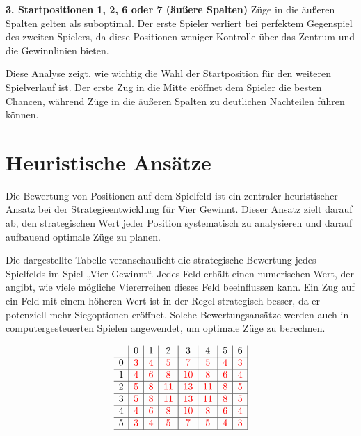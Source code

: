 	\textbf{3. Startpositionen 1, 2, 6 oder 7 (äußere Spalten)}
	Züge in die äußeren Spalten gelten als suboptimal. Der erste Spieler verliert bei perfektem Gegenspiel des zweiten Spielers, da diese Positionen weniger Kontrolle über das Zentrum und die Gewinnlinien bieten.
	
	Diese Analyse zeigt, wie wichtig die Wahl der Startposition für den weiteren Spielverlauf ist. Der erste Zug in die Mitte eröffnet dem Spieler die besten Chancen, während Züge in die äußeren Spalten zu deutlichen Nachteilen führen können.

\section{Heuristische Ansätze}

Die Bewertung von Positionen auf dem Spielfeld ist ein zentraler heuristischer Ansatz bei der Strategieentwicklung für Vier Gewinnt. Dieser Ansatz zielt darauf ab, den strategischen Wert jeder Position systematisch zu analysieren und darauf aufbauend optimale Züge zu planen.

Die dargestellte Tabelle veranschaulicht die strategische Bewertung jedes Spielfelds im Spiel „Vier Gewinnt“. Jedes Feld erhält einen numerischen Wert, der angibt, wie viele mögliche Viererreihen dieses Feld beeinflussen kann. Ein Zug auf ein Feld mit einem höheren Wert ist in der Regel strategisch besser, da er potenziell mehr Siegoptionen eröffnet. Solche Bewertungsansätze werden auch in computergesteuerten Spielen angewendet, um optimale Züge zu berechnen.

	\[
	\begin{array}{c|c|c|c|c|c|c|c|}
		& 0 & 1 & 2 & 3 & 4 & 5 & 6 \\ \hline
		0 & \textcolor{red}{3} & \textcolor{red}{4} & \textcolor{red}{5} & \textcolor{red}{7} & \textcolor{red}{5} & \textcolor{red}{4} & \textcolor{red}{3} \\ \hline
		1 & \textcolor{red}{4} & \textcolor{red}{6} & \textcolor{red}{8} & \textcolor{red}{10} & \textcolor{red}{8} & \textcolor{red}{6} & \textcolor{red}{4} \\ \hline
		2 & \textcolor{red}{5} & \textcolor{red}{8} & \textcolor{red}{11} & \textcolor{red}{13} & \textcolor{red}{11} & \textcolor{red}{8} & \textcolor{red}{5} \\ \hline
		3 & \textcolor{red}{5} & \textcolor{red}{8} & \textcolor{red}{11} & \textcolor{red}{13} & \textcolor{red}{11} & \textcolor{red}{8} & \textcolor{red}{5} \\ \hline
		4 & \textcolor{red}{4} & \textcolor{red}{6} & \textcolor{red}{8} & \textcolor{red}{10} & \textcolor{red}{8} & \textcolor{red}{6} & \textcolor{red}{4} \\ \hline
		5 & \textcolor{red}{3} & \textcolor{red}{4} & \textcolor{red}{5} & \textcolor{red}{7} & \textcolor{red}{5} & \textcolor{red}{4} & \textcolor{red}{3} \\ \hline
	\end{array}
	\]
	
